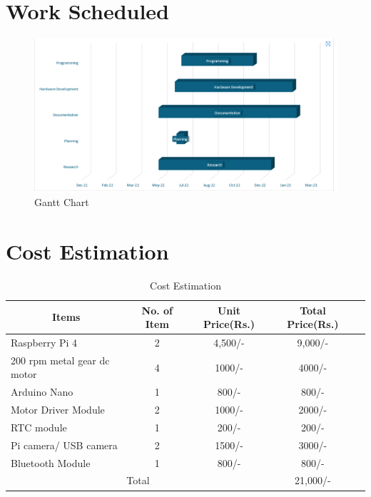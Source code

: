 \section{Work Scheduled}

\begin{figure}[H] %
\begin{center}
	\includegraphics[width = 7in]{images/ganttchart.png}
	\caption{Gantt Chart} %
	\label{figSample1} %
\end{center}
\end{figure}

\section{Cost Estimation}

\begin{table}[H]
\centering
\begin{tabular}{|l|c|c|c|c|} %
	\hline %
	\multicolumn{1}{|c|}{Items}  &No. of Item &Unit Price(Rs.) &Total Price(Rs.)\\
	\hline %
	Raspberry Pi 4 &2 &4,500/- &9,000/-\\
	\hline %
	200 rpm metal gear dc motor &4 &1000/- &4000/-\\
	\hline
	Arduino Nano &1 &800/- &800/-\\
	\hline
	Motor Driver Module &2 &1000/- &2000/-\\
	\hline
	RTC module &1 &200/- &200/-\\
	\hline
	Pi camera/ USB camera &2 &1500/- &3000/-\\
	\hline
	Bluetooth Module &1 &800/- &800/-\\
	\hline
	\multicolumn{3}{|c|}{Total} &21,000/-\\
	\hline
\end{tabular}

\caption{Cost Estimation}

\label{tblCostEstimationTable}
\end{table}

